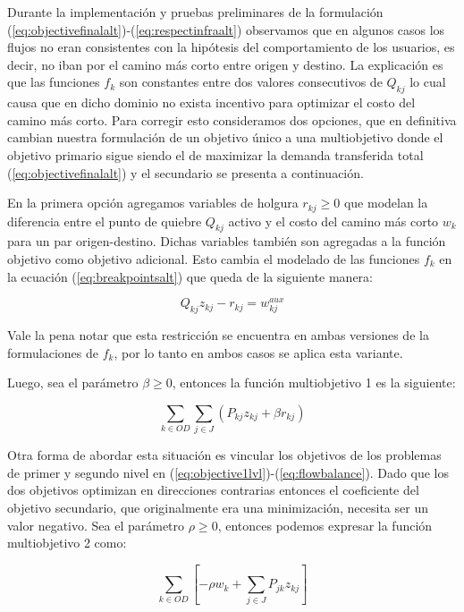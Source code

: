 Durante la implementación y pruebas preliminares de la formulación (\ref{eq:objectivefinalalt})-(\ref{eq:respectinfraalt}) observamos que en algunos casos los flujos no eran consistentes con la hipótesis del comportamiento de los usuarios, es decir, no iban por el camino más corto entre origen y destino. La explicación es que las funciones $f_k$ son constantes entre dos valores consecutivos de $Q_{kj}$ lo cual causa que en dicho dominio no exista incentivo para optimizar el costo del camino más corto. Para corregir esto consideramos dos opciones, que en definitiva cambian nuestra formulación de un objetivo único a una multiobjetivo donde el objetivo primario sigue siendo el de maximizar la demanda transferida total (\ref{eq:objectivefinalalt}) y el secundario se presenta a continuación.

En la primera opción agregamos variables de holgura $r_{kj} \geq 0$ que modelan la diferencia entre el punto de quiebre $Q_{kj}$ activo y el costo del camino más corto $w_k$ para un par origen-destino. Dichas variables también son agregadas a la función objetivo como objetivo adicional. Esto cambia el modelado de las funciones $f_k$ en la ecuación (\ref{eq:breakpointsalt}) que queda de la siguiente manera:

\begin{equation}
  \label{eq:multipleobj1breakpoint}
  Q_{kj} z_{kj} - r_{kj} = w^{aux}_{kj}
\end{equation}

Vale la pena notar que esta restricción se encuentra en ambas versiones de la formulaciones de $f_k$, por lo tanto en ambos casos se aplica esta variante.

Luego, sea el parámetro $\beta \geq 0$, entonces la función multiobjetivo 1 es la siguiente:

\begin{equation}
  \label{eq:multipleobj1}
  \sum_{k \in OD} \sum_{j \in J} \left( P_{kj}z_{kj} + \beta r_{kj} \right)
\end{equation}

Otra forma de abordar esta situación es vincular los objetivos de los problemas de primer y segundo nivel en (\ref{eq:objective1lvl})-(\ref{eq:flowbalance}). Dado que los dos objetivos optimizan en direcciones contrarias entonces el coeficiente del objetivo secundario, que originalmente era una minimización, necesita ser un valor negativo. Sea el parámetro $\rho \geq 0$, entonces podemos expresar la función multiobjetivo 2 como:

\begin{equation}
  \label{eq:multipleobj2}
  \sum_{k \in OD} \left[ -\rho w_k + \sum_{j \in J} P_{jk}z_{kj} \right]
\end{equation}

